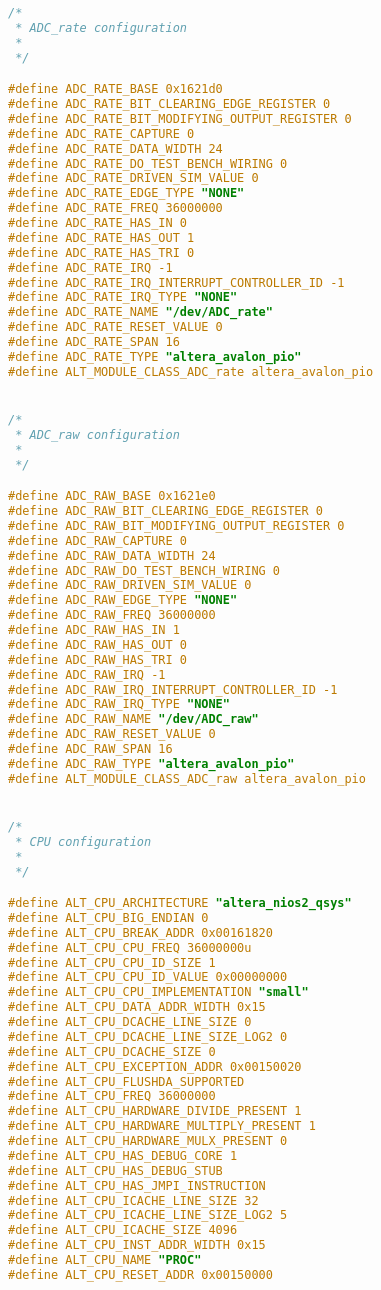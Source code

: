 \begin{lstlisting}[language=C]
/*
 * ADC_rate configuration
 *
 */

#define ADC_RATE_BASE 0x1621d0
#define ADC_RATE_BIT_CLEARING_EDGE_REGISTER 0
#define ADC_RATE_BIT_MODIFYING_OUTPUT_REGISTER 0
#define ADC_RATE_CAPTURE 0
#define ADC_RATE_DATA_WIDTH 24
#define ADC_RATE_DO_TEST_BENCH_WIRING 0
#define ADC_RATE_DRIVEN_SIM_VALUE 0
#define ADC_RATE_EDGE_TYPE "NONE"
#define ADC_RATE_FREQ 36000000
#define ADC_RATE_HAS_IN 0
#define ADC_RATE_HAS_OUT 1
#define ADC_RATE_HAS_TRI 0
#define ADC_RATE_IRQ -1
#define ADC_RATE_IRQ_INTERRUPT_CONTROLLER_ID -1
#define ADC_RATE_IRQ_TYPE "NONE"
#define ADC_RATE_NAME "/dev/ADC_rate"
#define ADC_RATE_RESET_VALUE 0
#define ADC_RATE_SPAN 16
#define ADC_RATE_TYPE "altera_avalon_pio"
#define ALT_MODULE_CLASS_ADC_rate altera_avalon_pio


/*
 * ADC_raw configuration
 *
 */

#define ADC_RAW_BASE 0x1621e0
#define ADC_RAW_BIT_CLEARING_EDGE_REGISTER 0
#define ADC_RAW_BIT_MODIFYING_OUTPUT_REGISTER 0
#define ADC_RAW_CAPTURE 0
#define ADC_RAW_DATA_WIDTH 24
#define ADC_RAW_DO_TEST_BENCH_WIRING 0
#define ADC_RAW_DRIVEN_SIM_VALUE 0
#define ADC_RAW_EDGE_TYPE "NONE"
#define ADC_RAW_FREQ 36000000
#define ADC_RAW_HAS_IN 1
#define ADC_RAW_HAS_OUT 0
#define ADC_RAW_HAS_TRI 0
#define ADC_RAW_IRQ -1
#define ADC_RAW_IRQ_INTERRUPT_CONTROLLER_ID -1
#define ADC_RAW_IRQ_TYPE "NONE"
#define ADC_RAW_NAME "/dev/ADC_raw"
#define ADC_RAW_RESET_VALUE 0
#define ADC_RAW_SPAN 16
#define ADC_RAW_TYPE "altera_avalon_pio"
#define ALT_MODULE_CLASS_ADC_raw altera_avalon_pio


/*
 * CPU configuration
 *
 */

#define ALT_CPU_ARCHITECTURE "altera_nios2_qsys"
#define ALT_CPU_BIG_ENDIAN 0
#define ALT_CPU_BREAK_ADDR 0x00161820
#define ALT_CPU_CPU_FREQ 36000000u
#define ALT_CPU_CPU_ID_SIZE 1
#define ALT_CPU_CPU_ID_VALUE 0x00000000
#define ALT_CPU_CPU_IMPLEMENTATION "small"
#define ALT_CPU_DATA_ADDR_WIDTH 0x15
#define ALT_CPU_DCACHE_LINE_SIZE 0
#define ALT_CPU_DCACHE_LINE_SIZE_LOG2 0
#define ALT_CPU_DCACHE_SIZE 0
#define ALT_CPU_EXCEPTION_ADDR 0x00150020
#define ALT_CPU_FLUSHDA_SUPPORTED
#define ALT_CPU_FREQ 36000000
#define ALT_CPU_HARDWARE_DIVIDE_PRESENT 1
#define ALT_CPU_HARDWARE_MULTIPLY_PRESENT 1
#define ALT_CPU_HARDWARE_MULX_PRESENT 0
#define ALT_CPU_HAS_DEBUG_CORE 1
#define ALT_CPU_HAS_DEBUG_STUB
#define ALT_CPU_HAS_JMPI_INSTRUCTION
#define ALT_CPU_ICACHE_LINE_SIZE 32
#define ALT_CPU_ICACHE_LINE_SIZE_LOG2 5
#define ALT_CPU_ICACHE_SIZE 4096
#define ALT_CPU_INST_ADDR_WIDTH 0x15
#define ALT_CPU_NAME "PROC"
#define ALT_CPU_RESET_ADDR 0x00150000



\end{lstlisting}
